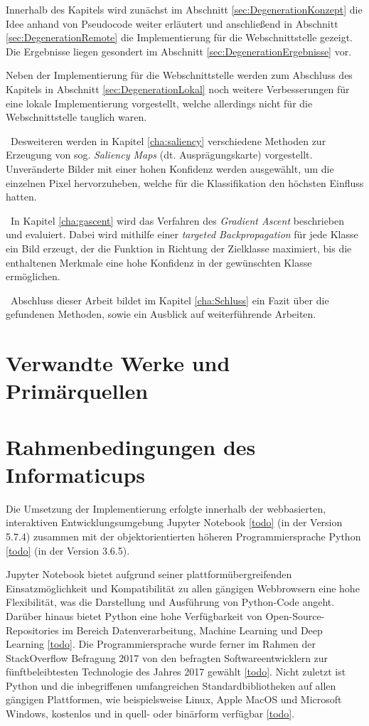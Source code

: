 Innerhalb des Kapitels wird zunächst im Abschnitt \ref{sec:DegenerationKonzept} die Idee anhand von Pseudocode weiter erläutert und anschließend in Abschnitt  \ref{sec:DegenerationRemote} die Implementierung für die Webschnittstelle gezeigt. Die Ergebnisse liegen gesondert im Abschnitt \ref{sec:DegenerationErgebnisse} vor. 

Neben der Implementierung für die Webschnittstelle werden zum Abschluss des Kapitels in Abschnitt \ref{sec:DegenerationLokal} noch weitere Verbesserungen für eine lokale Implementierung vorgestellt, welche allerdings nicht für die Webschnittstelle tauglich waren.


~\newline Desweiteren werden in Kapitel \ref{cha:saliency} verschiedene Methoden zur Erzeugung von sog. \textit{Saliency Maps} (dt. Ausprägungskarte) vorgestellt. Unveränderte Bilder mit einer hohen Konfidenz werden ausgewählt, um die einzelnen Pixel hervorzuheben, welche für die Klassifikation den höchsten Einfluss hatten.

~\newline In Kapitel \ref{cha:gascent} wird das Verfahren des \textit{Gradient Ascent} beschrieben und evaluiert. Dabei wird mithilfe einer \textit{targeted Backpropagation} für jede Klasse ein Bild erzeugt, der die Funktion in Richtung der Zielklasse maximiert, bis die enthaltenen Merkmale eine hohe Konfidenz in der gewünschten Klasse ermöglichen.

~\newline Abschluss dieser Arbeit bildet im Kapitel \ref{cha:Schluss} ein Fazit über die gefundenen Methoden, sowie ein Ausblick auf weiterführende Arbeiten. 
\section{Verwandte Werke und Primärquellen}
\label{sec:VerwandteWerke}

\section{Rahmenbedingungen des Informaticups}
Die Umsetzung der Implementierung erfolgte innerhalb der webbasierten, interaktiven Entwicklungsumgebung Jupyter Notebook \ref{todo} (in der Version 5.7.4) zusammen mit der objektorientierten höheren Programmiersprache Python \ref{todo} (in der Version 3.6.5).


Jupyter Notebook bietet aufgrund seiner plattformübergreifenden Einsatzmöglichkeit und Kompatibilität zu allen gängigen Webbrowsern eine hohe Flexibilität, was die Darstellung und Ausführung von Python-Code angeht. Darüber hinaus bietet Python eine hohe Verfügbarkeit von Open-Source-Repositories im Bereich Datenverarbeitung, Machine Learning und Deep Learning \ref{todo}. Die Programmiersprache wurde ferner im Rahmen der StackOverflow Befragung 2017 von den befragten Softwareentwicklern zur fünftbeleibtesten Technologie des Jahres 2017 gewählt \ref{todo}. Nicht zuletzt ist Python und die inbegriffenen umfangreichen Standardbibliotheken auf allen gängigen Plattformen, wie beispielsweise Linux, Apple MacOS und Microsoft Windows, kostenlos und in quell- oder binärform verfügbar \ref{todo}.


